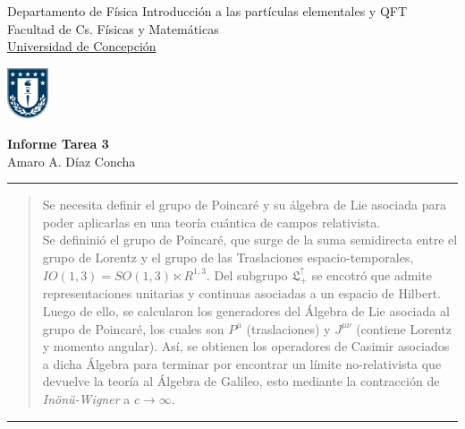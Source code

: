 \documentclass[12pt,letterpaper]{article}
\begin{document}

\usetikzlibrary{positioning}
\pagestyle{plain}
\begin{flushleft}
Departamento de Física \hfill Introducción a las partículas elementales y QFT\\
Facultad de Cs. Físicas y Matemáticas\\
\underline{Universidad de Concepción}
\end{flushleft}

\begin{flushright}\vspace{-5mm}
\includegraphics[height=1.5cm]{escudo .jpg}
\end{flushright}
 
\begin{center}\vspace{-1cm}
\textbf{\large Informe Tarea 3}\\   %
Amaro A. Díaz Concha\\                         %
\end{center}
\rule{\linewidth}{0.1mm}

 


\begin{abstract}
  Se necesita definir el grupo de Poincaré y su álgebra de Lie asociada para poder aplicarlas en una teoría cuántica de campos relativista. \\
  Se defininió el grupo de Poincaré, que surge de la suma semidirecta entre el grupo de Lorentz y el grupo de las Traslaciones espacio-temporales, $IO(1,3) =SO(1,3)\ltimes R^{1,3} $. Del subgrupo $\mathfrak{L}^\uparrow_+$ se encotró que admite representaciones unitarias y continuas asociadas a un espacio de Hilbert. \\
  Luego de ello, se calcularon los generadores del Álgebra de Lie asociada al grupo de Poincaré, los cuales son $P^\mu$ (traslaciones) y $J^{\mu\nu}$ (contiene Lorentz y momento angular). Así, se obtienen los operadores de Casimir asociados a dicha Álgebra para terminar por encontrar un límite no-relativista que devuelve la teoría al Álgebra de Galileo, esto mediante la contracción de \emph{Inönü-Wigner} a $c\to\infty$. 
\end{abstract}
\rule{\linewidth}{0.1mm}
\end{document}
